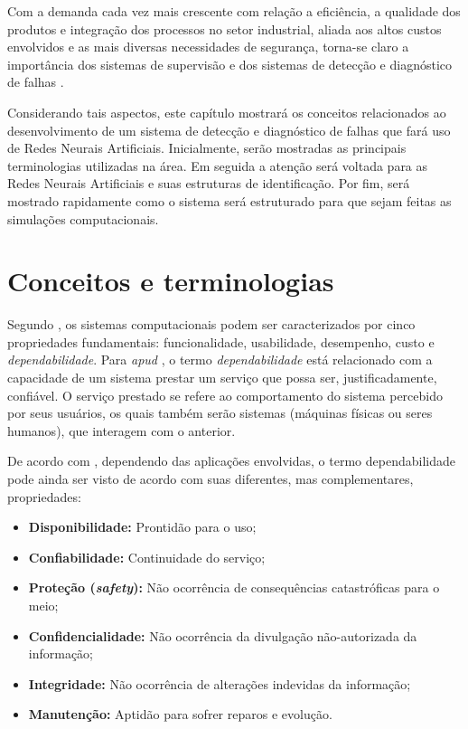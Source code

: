 \label{cap:aspectos}

Com a demanda cada vez mais crescente com relação a eficiência, a qualidade dos
produtos e integração dos processos no setor industrial, aliada aos altos custos
envolvidos e as mais diversas necessidades de segurança, torna-se claro a
importância dos sistemas de supervisão e dos sistemas de detecção e diagnóstico
de falhas \cite{isermann:2006}.

Considerando tais aspectos, este capítulo mostrará os conceitos relacionados ao
desenvolvimento de um sistema de detecção e diagnóstico de falhas que fará uso
de Redes Neurais Artificiais. Inicialmente, serão mostradas as principais
terminologias utilizadas na área. Em seguida a atenção será voltada para as
Redes Neurais Artificiais e suas estruturas de identificação. Por fim, será
mostrado rapidamente como o sistema será estruturado para que sejam feitas as
simulações computacionais.

\section{Conceitos e terminologias}
Segundo , os sistemas computacionais podem ser
caracterizados por cinco propriedades fundamentais: funcionalidade, usabilidade,
desempenho, custo e {\it dependabilidade}. Para  {\it
apud} , o termo {\it dependabilidade} está relacionado
com a capacidade de um sistema prestar um serviço que possa ser,
justificadamente, confiável. O serviço prestado se refere ao comportamento do
sistema percebido por seus usuários, os quais também serão sistemas
(máquinas físicas ou seres humanos), que interagem com o anterior.

De acordo com , dependendo das aplicações envolvidas, o
termo dependabilidade pode ainda ser visto de acordo com suas diferentes, mas
complementares, propriedades:

\begin{itemize}
    \item {\bf Disponibilidade:} Prontidão para o uso;
    \item {\bf Confiabilidade:} Continuidade do serviço;
    \item \textbf{Proteção (\textit{safety}):} Não ocorrência de consequências
          catastróficas para o meio;
    \item {\bf Confidencialidade:} Não ocorrência da divulgação não-autorizada
          da informação;
    \item {\bf Integridade:} Não ocorrência de alterações indevidas da
          informação;
    \item {\bf Manutenção:} Aptidão para sofrer reparos e evolução.
\end{itemize}

